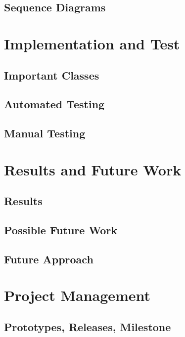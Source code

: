 \documentclass[a4paper,parskip=full]{scrreprt}
\begin{document}
\section{Sequence Diagrams}

\chapter{Implementation and Test}
\section{Important Classes}
\section{Automated Testing}
\section{Manual Testing}

\chapter{Results and Future Work}
\section{Results}
\section{Possible Future Work}
\section{Future Approach}

\chapter{Project Management}
\section{Prototypes, Releases, Milestone}
\end{document}
